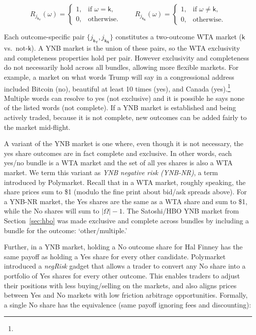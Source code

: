 \[
R_{j_{\mathsf{k_Y}}}(\omega)=
\begin{cases}
1, & \text{if } \omega=\mathsf{k},\\
0, & \text{otherwise.}
\end{cases}
\qquad
R_{j_{\mathsf{k_N}}}(\omega)=
\begin{cases}
1, & \text{if } \omega\neq\mathsf{k},\\
0, & \text{otherwise.}
\end{cases}
\]

Each outcome-specific pair $\{j_{\mathsf{k_Y}}, j_{\mathsf{k_N}}\}$ constitutes a two-outcome WTA market ($\mathsf{k}$ vs.\ not-$\mathsf{k}$). A YNB market is the union of these pairs, so the WTA exclusivity and completeness properties hold per pair. However exclusivity and completeness do not necessarily hold across all bundles, allowing more flexible markets. For example, a market on what words Trump will say in a congressional address included Bitcoin (no), beautiful at least 10 times (yes), and Canada (yes).\footnote{} Multiple words can resolve to yes (not exclusive) and it is possible he says none of the listed words (not complete). If a YNB market is established and being actively traded, because it is not complete, new outcomes can be added fairly to the market mid-flight. 

A variant of the YNB market is one where, even though it is not necessary, the yes share outcomes are in fact complete and exclusive. In other words, each yes/no bundle is a WTA market and the set of all yes shares is also a WTA market. We term this variant as \textit{YNB negative risk (YNB-NR)}, a term introduced by Polymarket. Recall that in a WTA market, roughly speaking, the share prices sum to \$1 (modulo the fine print about bid/ask spreads above). For a YNB-NR market, the Yes shares are the same as a WTA share and sum to \$1, while the No shares will sum to $|\Omega|-1$. The Satoshi/HBO YNB market from Section~\ref{sec:hbo} was made exclusive and complete across bundles by including a bundle for the outcome: `other/multiple.' 

Further, in a YNB market, holding a No outcome share for Hal Finney has the same payoff as holding a Yes share for every other candidate. Polymarket introduced a \textit{negRisk} gadget that allows a trader to convert any No share into a portfolio of Yes shares for every other outcome. This enables traders to adjust their positions with less buying/selling on the markets, and also aligns prices between Yes and No markets with low friction arbitrage opportunities. Formally, a single No share has the equivalence (\ie same payoff ignoring fees and discounting):

